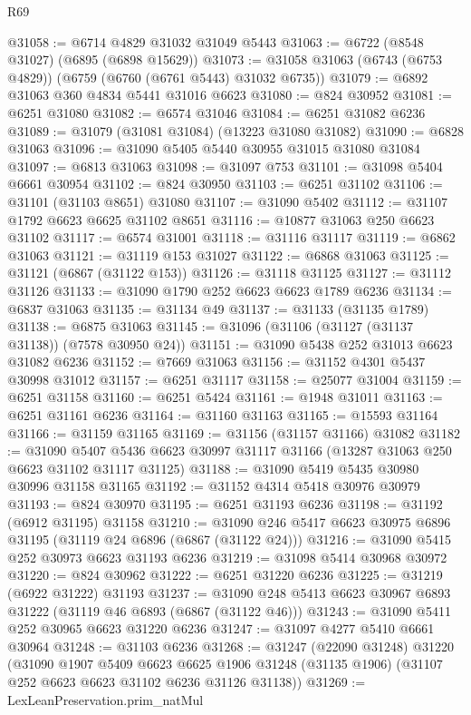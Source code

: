 \begin{lexlean}{R69}
\begin{coremodule}
{@31058 := @6714 @4829 @31032 @31049 @5443
@31063 := @6722 (@8548 @31027) (@6895 (@6898 @15629))
@31073 := @31058 @31063 (@6743 (@6753 @4829)) (@6759 (@6760 (@6761 @5443) @31032 @6735))
@31079 := @6892 @31063 @360 @4834 @5441 @31016 @6623
@31080 := @824 @30952
@31081 := @6251 @31080
@31082 := @6574 @31046
@31084 := @6251 @31082 @6236
@31089 := @31079 (@31081 @31084) (@13223 @31080 @31082)
@31090 := @6828 @31063
@31096 := @31090 @5405 @5440 @30955 @31015 @31080 @31084
@31097 := @6813 @31063
@31098 := @31097 @753
@31101 := @31098 @5404 @6661 @30954
@31102 := @824 @30950
@31103 := @6251 @31102
@31106 := @31101 (@31103 @8651) @31080
@31107 := @31090 @5402
@31112 := @31107 @1792 @6623 @6625 @31102 @8651
@31116 := @10877 @31063 @250 @6623 @31102
@31117 := @6574 @31001
@31118 := @31116 @31117
@31119 := @6862 @31063
@31121 := @31119 @153 @31027
@31122 := @6868 @31063
@31125 := @31121 (@6867 (@31122 @153))
@31126 := @31118 @31125
@31127 := @31112 @31126
@31133 := @31090 @1790 @252 @6623 @6623 @1789 @6236
@31134 := @6837 @31063
@31135 := @31134 @49
@31137 := @31133 (@31135 @1789)
@31138 := @6875 @31063
@31145 := @31096 (@31106 (@31127 (@31137 @31138)) (@7578 @30950 @24))
@31151 := @31090 @5438 @252 @31013 @6623 @31082 @6236
@31152 := @7669 @31063
@31156 := @31152 @4301 @5437 @30998 @31012
@31157 := @6251 @31117
@31158 := @25077 @31004
@31159 := @6251 @31158
@31160 := @6251 @5424
@31161 := @1948 @31011
@31163 := @6251 @31161 @6236
@31164 := @31160 @31163
@31165 := @15593 @31164
@31166 := @31159 @31165
@31169 := @31156 (@31157 @31166) @31082
@31182 := @31090
    @5407
    @5436
    @6623
    @30997
    @31117
    @31166
    (@13287 @31063 @250 @6623 @31102 @31117 @31125)
@31188 := @31090 @5419 @5435 @30980 @30996 @31158 @31165
@31192 := @31152 @4314 @5418 @30976 @30979
@31193 := @824 @30970
@31195 := @6251 @31193 @6236
@31198 := @31192 (@6912 @31195) @31158
@31210 := @31090 @246 @5417 @6623 @30975 @6896 @31195 (@31119 @24 @6896 (@6867 (@31122 @24)))
@31216 := @31090 @5415 @252 @30973 @6623 @31193 @6236
@31219 := @31098 @5414 @30968 @30972
@31220 := @824 @30962
@31222 := @6251 @31220 @6236
@31225 := @31219 (@6922 @31222) @31193
@31237 := @31090 @248 @5413 @6623 @30967 @6893 @31222 (@31119 @46 @6893 (@6867 (@31122 @46)))
@31243 := @31090 @5411 @252 @30965 @6623 @31220 @6236
@31247 := @31097 @4277 @5410 @6661 @30964
@31248 := @31103 @6236
@31268 := @31247
    (@22090 @31248)
    @31220
    (@31090
      @1907
      @5409
      @6623
      @6625
      @1906
      @31248
      (@31135 @1906)
      (@31107 @252 @6623 @6623 @31102 @6236 @31126 @31138))
@31269 := LexLeanPreservation.prim_natMul
}
\end{coremodule}
\end{lexlean}
